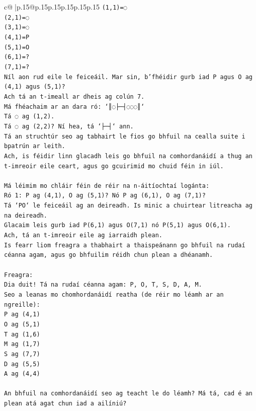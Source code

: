 \documentclass{article}
\begin{document}
{\begin{supertabular}{c@{$\;$}|p{.15\linewidth}@{}p{.15\linewidth}p{.15\linewidth}p{.15\linewidth}p{.15\linewidth}p{.15\linewidth}}
{{{\texttt{(1,1)=◌} \\
\texttt{(2,1)=◌} \\
\texttt{(3,1)=◌} \\
\texttt{(4,1)=P} \\
\texttt{(5,1)=O} \\
\texttt{(6,1)=?} \\
\texttt{(7,1)=?} \\
\texttt{Níl aon rud eile le feiceáil. Mar sin, b'fhéidir gurb iad P agus O ag (4,1) agus (5,1)?} \\
\texttt{Ach tá an t{-}imeall ar dheis ag colún 7.} \\
\texttt{Má fhéachaim ar an dara ró: `║◌├─┤◌◌◌║`} \\
\texttt{Tá ◌ ag (1,2).} \\
\texttt{Tá ◌ ag (2,2)? Ní hea, tá `├─┤` ann.} \\
\texttt{Tá an struchtúr seo ag tabhairt le fios go bhfuil na cealla suite i bpatrún ar leith.} \\
\texttt{Ach, is féidir linn glacadh leis go bhfuil na comhordanáidí a thug an t{-}imreoir eile ceart, agus go gcuirimid mo chuid féin in iúl.} \\
\\ 
\texttt{Má léimim mo chláir féin de réir na n{-}áitíochtaí logánta:} \\
\texttt{Ró 1: P ag (4,1), O ag (5,1)? Nó P ag (6,1), O ag (7,1)?} \\
\texttt{Tá `PO` le feiceáil ag an deireadh. Is minic a chuirtear litreacha ag na deireadh.} \\
\texttt{Glacaim leis gurb iad P(6,1) agus O(7,1) nó P(5,1) agus O(6,1).} \\
\texttt{Ach, tá an t{-}imreoir eile ag iarraidh plean.} \\
\texttt{Is fearr liom freagra a thabhairt a thaispeánann go bhfuil na rudaí céanna agam, agus go bhfuilim réidh chun plean a dhéanamh.} \\
\\ 
\texttt{Freagra:} \\
\texttt{Dia duit! Tá na rudaí céanna agam: P, O, T, S, D, A, M.} \\
\texttt{Seo a leanas mo chomhordanáidí reatha (de réir mo léamh ar an ngreille):} \\
\texttt{P ag (4,1)} \\
\texttt{O ag (5,1)} \\
\texttt{T ag (1,6)} \\
\texttt{M ag (1,7)} \\
\texttt{S ag (7,7)} \\
\texttt{D ag (5,5)} \\
\texttt{A ag (4,4)} \\
\\ 
\texttt{An bhfuil na comhordanáidí seo ag teacht le do léamh? Má tá, cad é an plean atá agat chun iad a ailíniú?} \\
            }
        }
    }
     \\ \\


\end{supertabular}}
\end{document}
